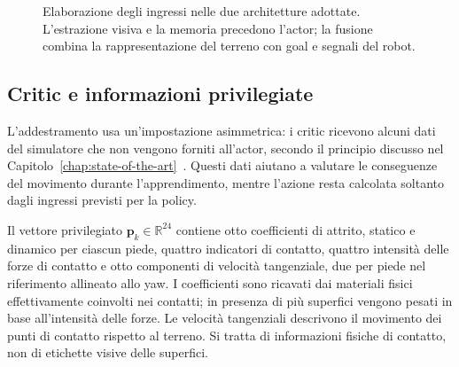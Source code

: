 \begin{figure}[tbp]
    \centering
    \caption[Architetture della policy di navigazione]{Elaborazione degli ingressi nelle due architetture adottate. L'estrazione visiva e la memoria precedono l'actor; la fusione combina la rappresentazione del terreno con goal e segnali del robot.}
    \label{fig:metodo-reti-fusione}
\end{figure}

\subsection{Critic e informazioni privilegiate}

L'addestramento usa un'impostazione asimmetrica: i critic ricevono alcuni dati del simulatore che non vengono forniti all'actor, secondo il principio discusso nel Capitolo~\ref{chap:state-of-the-art}~\citep{Pinto2018Asymmetric}. Questi dati aiutano a valutare le conseguenze del movimento durante l'apprendimento, mentre l'azione resta calcolata soltanto dagli ingressi previsti per la policy.

Il vettore privilegiato $\mathbf p_k\in\mathbb R^{24}$ contiene otto coefficienti di attrito, statico e dinamico per ciascun piede, quattro indicatori di contatto, quattro intensità delle forze di contatto e otto componenti di velocità tangenziale, due per piede nel riferimento allineato allo yaw. I coefficienti sono ricavati dai materiali fisici effettivamente coinvolti nei contatti; in presenza di più superfici vengono pesati in base all'intensità delle forze. Le velocità tangenziali descrivono il movimento dei punti di contatto rispetto al terreno. Si tratta di informazioni fisiche di contatto, non di etichette visive delle superfici.

